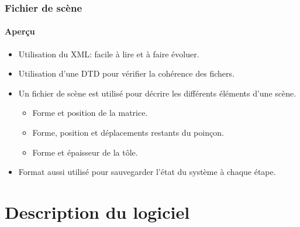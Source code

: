 \documentclass{beamer}
\begin{document}
\begin{frame}
    \frametitle{Fichier de scène}
    \framesubtitle{Aperçu}
    \begin{itemize}
        \item Utilisation du XML: facile à lire et à faire évoluer.
        \item Utilisation d'une DTD pour vérifier la cohérence des fichers.
        \item Un fichier de scène est utilisé pour décrire les différents éléments d'une scène.
            \begin{itemize}
                \item Forme et position de la matrice.
                \item Forme, position et déplacements restants du poinçon.
                \item Forme et épaisseur de la tôle.
            \end{itemize}
        \item Format aussi utilisé pour sauvegarder l'état du système à chaque étape.
    \end{itemize}
\end{frame}

\section{Description du logiciel}
\end{document}
